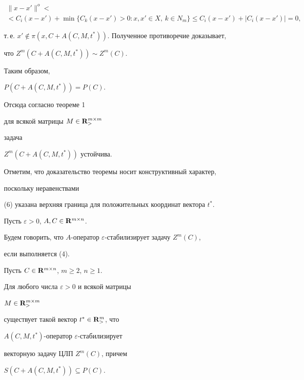 \begin{pf}
\begin{multline*}
\| x-x'\|^o < \\


%


< C_i(x-x')+ \min\{C_k(x-x')>0: x,x'\in X,\ k\in N_m\}\le 


C_i(x-x')+| C_i(x-x')| =0,


\end{multline*}


т.\,е. $x'\notin \pi(x, C+A(C, M, t^*))$. Полученное противоречие доказывает,


что $Z^m(C+A(C, M, t^*))\sim Z^m(C)$.


Таким образом,


$P(C+A(C, M, t^*))=P(C)$.


Отсюда согласно теореме 1


для всякой матрицы $M\in {\bold R}^{m\times m}_>$


задача


$Z^m(C+A(C, M, t^*))$ устойчива.


\end{pf}





Отметим, что доказательство теоремы носит конструктивный характер,


поскольку неравенствами


(6) указана верхняя граница для положительных координат вектора $t^*$.





Пусть $\varepsilon >0$, $A, C\in {\bold R}^{m\times n}$.


Будем говорить, что $A$-оператор $\varepsilon$-стабилизирует задачу $Z^m(C)$,


если выполняется (4).





\begin{thm}


Пусть $C\in {\bold R}^{m\times n}$, $m\ge 2$, $n\ge 1$.


Для любого числа $\varepsilon>0$ и всякой матрицы


$M\in {\bold R}_>^{m\times m}$


существует такой вектор $t^*\in {\bold R}_>^m$, что


$A(C, M, t^*)$-оператор $\varepsilon$-стабилизирует


векторную задачу ЦЛП $Z^m(C)$, причем


$S(C+A(C, M, t^*))\subseteq P(C)$.


\end{thm}





